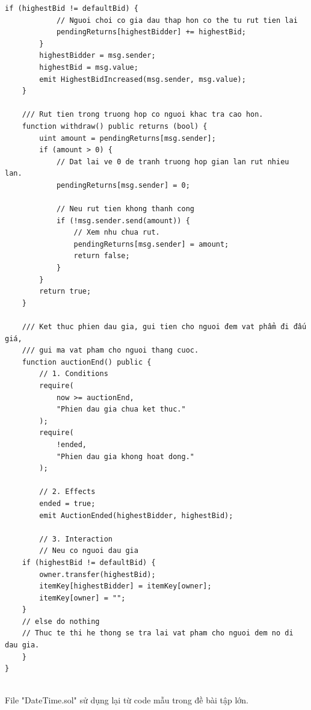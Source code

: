 \documentclass[a4paper]{article}
\begin{document}
\begin{frame}
\begin{lstlisting}[basicstyle=\small]
        if (highestBid != defaultBid) {
            // Nguoi choi co gia dau thap hon co the tu rut tien lai
            pendingReturns[highestBidder] += highestBid;
        }
        highestBidder = msg.sender;
        highestBid = msg.value;
        emit HighestBidIncreased(msg.sender, msg.value);
    }

    /// Rut tien trong truong hop co nguoi khac tra cao hon.
    function withdraw() public returns (bool) {
        uint amount = pendingReturns[msg.sender];
        if (amount > 0) {
            // Dat lai ve 0 de tranh truong hop gian lan rut nhieu lan.
            pendingReturns[msg.sender] = 0;
            
            // Neu rut tien khong thanh cong
            if (!msg.sender.send(amount)) {
                // Xem nhu chua rut.
                pendingReturns[msg.sender] = amount;
                return false;
            }
        }
        return true;
    }

    /// Ket thuc phien dau gia, gui tien cho nguoi đem vat phẩm đi đấu giá,
    /// gui ma vat pham cho nguoi thang cuoc.
    function auctionEnd() public {
        // 1. Conditions
        require(
            now >= auctionEnd, 
            "Phien dau gia chua ket thuc."
        );
        require(
            !ended, 
            "Phien dau gia khong hoat dong."
        );

        // 2. Effects
        ended = true;
        emit AuctionEnded(highestBidder, highestBid);

        // 3. Interaction
        // Neu co nguoi dau gia
	if (highestBid != defaultBid) {
	    owner.transfer(highestBid);
	    itemKey[highestBidder] = itemKey[owner];
	    itemKey[owner] = "";
	}
	// else do nothing
	// Thuc te thi he thong se tra lai vat pham cho nguoi dem no di dau gia.
    }
}
\end{lstlisting}
\end{frame}\\

File "DateTime.sol" sử dụng lại từ code mẫu trong đề bài tập lớn.
\end{document}
